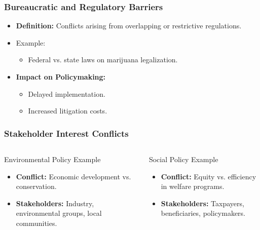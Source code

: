 \documentclass[10pt]{beamer}
\begin{document}
            \begin{frame}
                \frametitle{Bureaucratic and Regulatory Barriers}
                \begin{itemize}
                    \item \textbf{Definition:} Conflicts arising from overlapping or restrictive regulations.
                    \item Example:
                        \begin{itemize}
                            \item Federal vs. state laws on marijuana legalization.
                        \end{itemize}
                    \item \textbf{Impact on Policymaking:}
                        \begin{itemize}
                            \item Delayed implementation.
                            \item Increased litigation costs.
                        \end{itemize}
                \end{itemize}

                \begin{frame}
                    \frametitle{Stakeholder Interest Conflicts}
                    \begin{columns}[T,onlytextwidth]
                        \begin{block}{Environmental Policy Example}
                            \begin{itemize}
                                \item \textbf{Conflict:} Economic development vs. conservation.
                                \item \textbf{Stakeholders:} Industry, environmental groups, local communities.
                            \end{itemize}
                        \end{block}
                        \begin{block}{Social Policy Example}
                            \begin{itemize}
                                \item \textbf{Conflict:} Equity vs. efficiency in welfare programs.
                                \item \textbf{Stakeholders:} Taxpayers, beneficiaries, policymakers.
                            \end{itemize}
                        \end{block}
                    \end{columns}
                    

\end{frame}
\end{frame}
\end{document}
